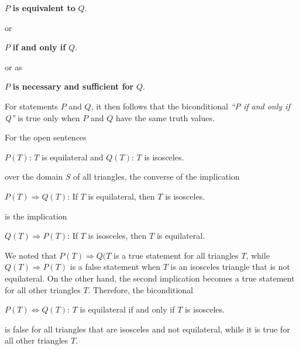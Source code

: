 \begin{center}
     $P$ \textbf{is equivalent to} $Q$.
\end{center}
or
\begin{center}
     $P$ \textbf{if and only if} $Q$. 
\end{center}
or as 
\begin{center}
     $P$ \textbf{is necessary and sufficient for} $Q$.
\end{center}
For statements $P$ and $Q$, it then follows that the biconditional \textit{“P if and only if Q”} 
is true only when $P$ and $Q$ have the same truth values.
\begin{eg}
     For the open sentences
     \begin{center}
          $P(T)$: $T$ is equilateral \qquad and \qquad $Q(T)$: $T$ is isosceles.
     \end{center}
     over the domain $S$ of all triangles, the converse of the implication
     \begin{center}
          $P(T) \Rightarrow Q(T)$: If $T$ is equilateral, then $T$ is isosceles.
     \end{center}
     is the implication
     \begin{center}
          $Q(T) \Rightarrow P(T)$: If $T$ is isosceles, then $T$ is equilateral.
     \end{center}
     We noted that $P(T) \Rightarrow Q(T $ is a true statement for all triangles $T$, while $Q(T) \Rightarrow P(T)$
    is a false statement when $T$ is an isosceles triangle that is not equilateral. On the other
    hand, the second implication becomes a true statement for all other triangles $T$. Therefore, the biconditional
     \begin{center}
          $P(T) \Leftrightarrow Q(T)$: $T$ is equilateral if and only if $T$ is isosceles.
     \end{center}
     is false for all triangles that are isosceles and not equilateral, while it is true for all other
    triangles $T$.
\end{eg}


